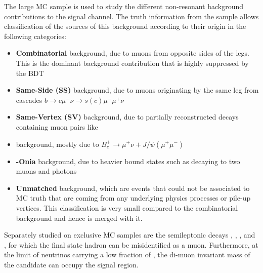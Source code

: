 The large \bbmumuX MC sample is used to study the different non-resonant background contributions to the signal channel. The truth information from the \bbmumuX sample allows classification of the sources of this background according to their origin in the following categories:
\begin{itemize}
   \item \textbf{Combinatorial} background, due to muons from opposite sides of the \bb legs. This is the dominant background contribution that is highly suppressed by the BDT 
   \item \textbf{Same-Side (SS)} background, due to muons originating by the same \bQuark leg from cascades \ensuremath{b\to c\mu^{-}\nu\to s(c)\mu^{-}\mu^{+}\nu}   
   \item \textbf{Same-Vertex (SV)} background, due to partially reconstructed \bmeson decays containing muon pairs like \BpmKmumu
   \item \textbf{\Bc} background, mostly due to $B_c^+\to \mu^{+}\nu + J/\psi(\mu^{+}\mu^{-})$ 
   \item \textbf{\bQuark-Onia} background, due to heavier \bb bound states such as \UpsilonMeson decaying to two muons and photons
   \item \textbf{Unmatched} background, which are events that could not be associated to MC truth that are coming from any underlying physics processes or pile-up vertices. This classification is very small compared to the combinatorial background and hence is merged with it. 
\end{itemize}

Separately studied on exclusive MC samples are the semileptonic decays \AntiLPMuNu, \LPMuNu, \BsKmMupNu, and \BdPimMuPNu, for which the final state hadron can be misidentified as a muon. Furthermore, at the limit of neutrinos carrying a low fraction of \Bpt, the di-muon invariant mass of the candidate can occupy the signal region.

